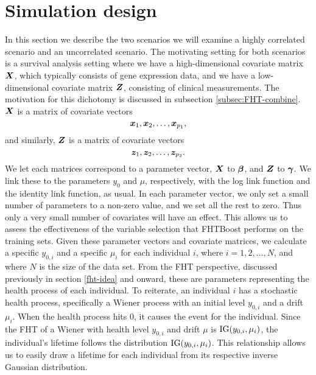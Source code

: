 \section{Simulation design}
In this section we describe the two scenarios we will examine a highly correlated scenario and an uncorrelated scenario.
The motivating setting for both scenarios is a survival analysis setting where we have a high-dimensional covariate matrix $\bm{X}$, which typically consists of gene expression data, and we have a low-dimensional covariate matrix $\bm{Z}$, consisting of clinical measurements.
The motivation for this dichotomy is discussed in subsection \ref{subsec:FHT-combine}.
$\bm{X}$ is a matrix of covariate vectors
\begin{equation*}
    \bm{x}_1,\bm{x}_2,\ldots,\bm{x}_{p_1},
\end{equation*}
and similarly, $\bm{Z}$ is a matrix of covariate vectors
\begin{equation*}
    \bm{z}_1,\bm{z}_2,\ldots,\bm{z}_{p_2}.
\end{equation*}
We let each matrices correspond to a parameter vector, $\bm{X}$ to $\boldsymbol{\beta}$, and $\bm{Z}$ to $\boldsymbol{\gamma}$.
We link these to the parameters $y_0$ and $\mu$, respectively, with the log link function and the identity link function, as usual.
In each parameter vector, we only set a small number of parameters to a non-zero value, and we set all the rest to zero.
Thus only a very small number of covariates will have an effect.
This allows us to assess the effectiveness of the variable selection that FHTBoost performs on the training sets.
Given these parameter vectors and covariate matrices, we calculate a specific $y_{0,i}$ and a specific $\mu_i$ for each individual $i$, where $i=1,2,\ldots,N$, and where $N$ is the size of the data set.
From the FHT perspective, discussed previously in section \ref{fht-idea} and onward, these are parameters representing the health process of each individual.
To reiterate, an individual $i$ has a stochastic health process, specifically a Wiener process with an initial level $y_{0,i}$ and a drift $\mu_i$.
When the health process hits 0, it causes the event for the individual.
Since the FHT of a Wiener with health level $y_{0,i}$ and drift $\mu$ is $\operatorname{IG}(y_{0,i},\mu_i)$, the individual's lifetime follows the distribution $\operatorname{IG}(y_{0,i},\mu_i)$.
This relationship allows us to easily draw a lifetime for each individual from its respective inverse Gaussian distribution.

